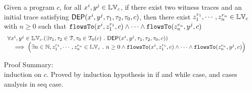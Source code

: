 \begin{thm}
\label{thm:flowsto_soundness}
Given a program ${c}$, for all  $ x^i, y^j \in \mathbb{LV}_{{c}}$, if there exist two witness traces 
and an initial trace satisfying $\mathsf{DEP}(x^i, y^j, \mathtt{\tau}_1, \mathtt{\tau}_2, \mathtt{\tau}_0, {c})$,
then
there exist $z_1^{r_1}, \cdots, z_n^{r_n} \in \mathbb{LV}_{{c}}$ with $n \geq 0$ such that   
$\mathtt{flowsTo}(x^i,  z_1^{r_1}, c) 
\land \cdots \land \mathtt{flowsTo}(z_n^{r_n}, y^j, c)$
%
\[
\begin{array}{l}
  \forall x^i, y^j \in \mathbb{LV}_{{c}}.
  (\exists \mathtt{\tau}_1, \mathtt{\tau}_2 \in \mathcal{T}, \mathtt{\tau}_0 \in \mathcal{T}_0(c) ~.~ \mathsf{DEP}(x^i, y^j, \mathtt{\tau}_1, \mathtt{\tau}_2, \mathtt{\tau}_0, {c}) )
  \\ \quad \implies
  \Big( \exists n \in \mathbb{N}, z_1^{r_1}, \cdots, z_n^{r_n} \in \mathbb{LV}_{{c}} ~.~ n \geq 0 \land
  \mathtt{flowsTo}(x^i,  z_1^{r_1}, c) 
  \land \cdots \land \mathtt{flowsTo}(z_n^{r_n}, y^j, c) \Big)
\end{array}
\]
\end{thm}
Proof Summary:
\\
induction on $c$. Proved by induction hypothesis in if and while case, and cases analysis in seq case.
%
%
